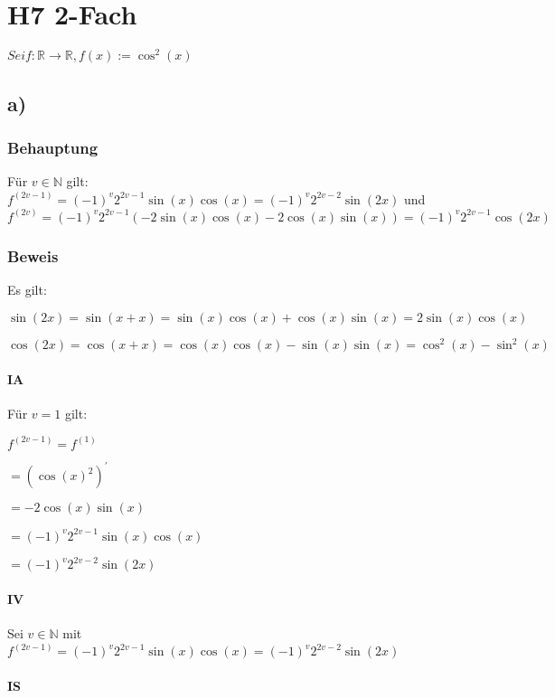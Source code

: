 \section*{H7 2-Fach}


$Sei f:\mathbb{R}\to\mathbb{R}, f(x) := \cos^{2}(x)$

\subsection*{a)}

\subsubsection*{Behauptung}
Für $v \in \mathbb{N}$ gilt:
$f^{(2v-1)} = (-1)^{v} 2^{2v-1} \sin(x)\cos(x) = (-1)^{v} 2^{2v-2} \sin(2x) $ und 
$f^{(2v)} = (-1)^{v} 2^{2v-1}(-2\sin(x)\cos(x)-2\cos(x)\sin(x)) = (-1)^{v} 2^{2v-1}\cos(2x) $

\subsubsection*{Beweis}

Es gilt:

	$\sin(2x) = \sin(x + x) = \sin(x)\cos(x)+\cos(x)\sin(x) = 2\sin(x)\cos(x)$

	$\cos(2x) = \cos(x + x) =\cos(x)\cos(x) - \sin(x)\sin(x) = \cos^{2}(x)-\sin^{2}(x)$

\paragraph*{IA}
Für $v = 1$ gilt: 

$	f^{(2v-1)} = f^{(1)} $

$   = (\cos(x)^{2})^{\prime} $

$	= -2\cos(x)\sin(x) $
	
$	= (-1)^{v} 2^{2v-1} \sin(x)\cos(x) $
	
$	= (-1)^{v} 2^{2v-2} \sin(2x) $

\paragraph*{IV}

Sei $v \in \mathbb{N}$ mit 
$f^{(2v-1)} = (-1)^{v} 2^{2v-1} \sin(x)\cos(x) = (-1)^{v} 2^{2v-2} \sin(2x)$

\paragraph*{IS}

